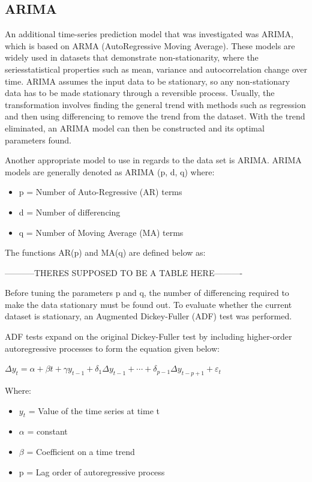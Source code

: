 \documentclass{mcmthesis}
\begin{document}
    \subsection{ARIMA}
    An additional time-series prediction model that was investigated was ARIMA, which is based on ARMA (AutoRegressive Moving Average). These models are widely used in datasets that demonstrate non-stationarity, where the series\textquotesingle statistical properties such as mean, variance and autocorrelation change over time. ARIMA assumes the input data to be stationary, so any non-stationary data has to be made stationary through a reversible process. Usually, the transformation involves finding the general trend with methods such as regression and then using differencing to remove the trend from the dataset. With the trend eliminated, an ARIMA model can then be constructed and its optimal parameters found.

    Another appropriate model to use in regards to  the data set is ARIMA. ARIMA models are generally denoted as ARIMA (p, d, q) where:
    \begin{itemize}
        \item p = Number of Auto-Regressive (AR) terms
        \item d = Number of differencing
        \item q = Number of Moving Average (MA) terms
    \end{itemize}

    The functions AR(p) and MA(q) are defined below as:

    -----------THERES SUPPOSED TO BE A TABLE HERE----------

    Before tuning the parameters p and q, the number of differencing required to make the data stationary must be found out. To evaluate whether the current dataset is stationary, an Augmented Dickey-Fuller (ADF) test was performed.

    ADF tests expand on the original Dickey-Fuller test by including higher-order autoregressive processes to form the equation given below:

    ${\Delta y_{t}=\alpha +\beta t+\gamma y_{t-1}+\delta _{1}\Delta y_{t-1}+\cdots +\delta _{p-1}\Delta y_{t-p+1}+\varepsilon _{t}}$

    Where:
    \begin{itemize}
        \item ${y_{t}}$ = Value of the time series at time t
        \item ${\alpha}$ = constant
        \item ${\beta}$ = Coefficient on a time trend
        \item {p} = Lag order of autoregressive process
    \end{itemize}
\end{document}
